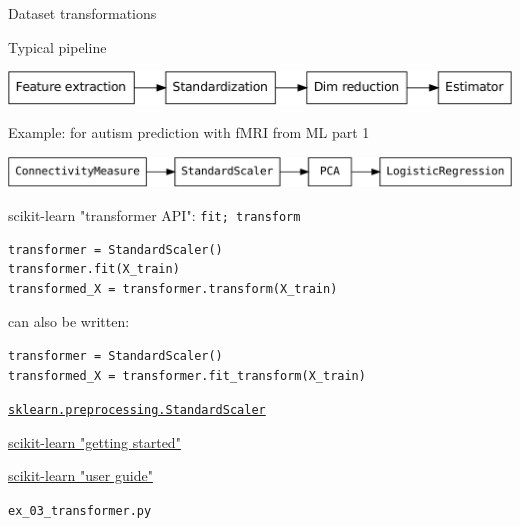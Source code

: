 \documentclass[presentation,mathserif,table]{beamer}
\begin{document}
\begin{frame}[label={sec:org7a37111}]{Dataset transformations}
\begin{block}{Typical pipeline}
\begin{center}
\includegraphics[width=.9\linewidth]{pipeline.pdf}
\end{center}
\end{block}

\begin{block}{Example: for autism prediction with fMRI from ML part 1}
\begin{center}
\includegraphics[width=.9\linewidth]{pipeline_example.pdf}
\end{center}
\end{block}
\end{frame}
\begin{frame}[label={sec:orged28f64},fragile]{scikit-learn "transformer API": \texttt{fit; transform}}
 \begin{verbatim}
transformer = StandardScaler()
transformer.fit(X_train)
transformed_X = transformer.transform(X_train)
\end{verbatim}
\begin{block}{can also be written:}
\begin{verbatim}
transformer = StandardScaler()
transformed_X = transformer.fit_transform(X_train)
\end{verbatim}
\end{block}
\begin{structureenv} %
\vfill
\href{https://scikit-learn.org/stable/modules/generated/sklearn.preprocessing.StandardScaler.html\#sklearn.preprocessing.StandardScaler}{\texttt{sklearn.preprocessing.StandardScaler}}

\href{https://scikit-learn.org/stable/getting\_started.html\#transformers-and-pre-processors}{scikit-learn "getting started"}

\href{https://scikit-learn.org/stable/data\_transforms.html}{scikit-learn "user guide"}

\vfill
\texttt{ex\_03\_transformer.py}
\end{structureenv}
\end{frame}
\end{document}
